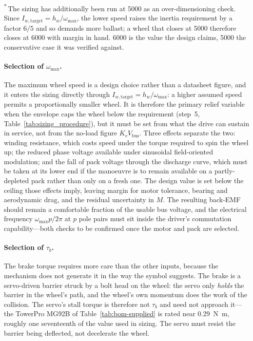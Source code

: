\begin{table}[htbp]
\vspace{0.4em}
{\footnotesize\RaggedRight\textsuperscript{*}\,The sizing has additionally been
run at \qty{5000}{\rpm} as an over-dimensioning check. Since
$I_{w,\text{target}} = h_w/\omega_{\max}$, the lower speed raises the inertia
requirement by a factor $6/5$ and so demands more ballast; a wheel that closes
at \qty{5000}{\rpm} therefore closes at \qty{6000}{\rpm} with margin in hand.
\qty{6000}{\rpm} is the value the design claims, \qty{5000}{\rpm} the
conservative case it was verified against.\par}
\end{table}

\paragraph{Selection of $\omega_{\max}$.} The maximum wheel speed is a design
choice rather than a datasheet figure, and it enters the sizing directly
through $I_{w,\text{target}} = h_w/\omega_{\max}$: a higher assumed speed
permits a proportionally smaller wheel. It is therefore the primary relief
variable when the envelope caps the wheel below the requirement (step~5,
Table~\ref{tab:sizing_procedure}), but it must be set from what the drive can
sustain in service, not from the no-load figure $K_v V_{\text{bus}}$. Three
effects separate the two: winding resistance, which costs speed under the torque
required to spin the wheel up; the reduced phase voltage available under
sinusoidal field-oriented modulation; and the fall of pack voltage through the
discharge curve, which must be taken at its lower end if the manoeuvre is to
remain available on a partly-depleted pack rather than only on a fresh one. The
design value is set below the ceiling those effects imply, leaving margin for
motor tolerance, bearing and aerodynamic drag, and the residual uncertainty in
$M$. The resulting back-EMF should remain a comfortable fraction of the usable
bus voltage, and the electrical frequency $\omega_{\max}p/2\pi$ at $p$ pole
pairs must sit inside the driver's commutation capability---both checks to be
confirmed once the motor and pack are selected.

\paragraph{Selection of $\tau_b$.} The brake torque requires more care than the other inputs, because the
mechanism does not generate it in the way the symbol suggests. The brake is a
servo-driven barrier struck by a bolt head on the wheel: the servo only
\emph{holds} the barrier in the wheel's path, and the wheel's own momentum does
the work of the collision. The servo's stall torque is therefore not $\tau_b$
and need not approach it---the TowerPro MG92B of
Table~\ref{tab:bom-supplied} is rated near \qty{0.29}{\newton\metre}, roughly
one seventeenth of the value used in sizing. The servo must resist the barrier
being deflected, not decelerate the wheel.

